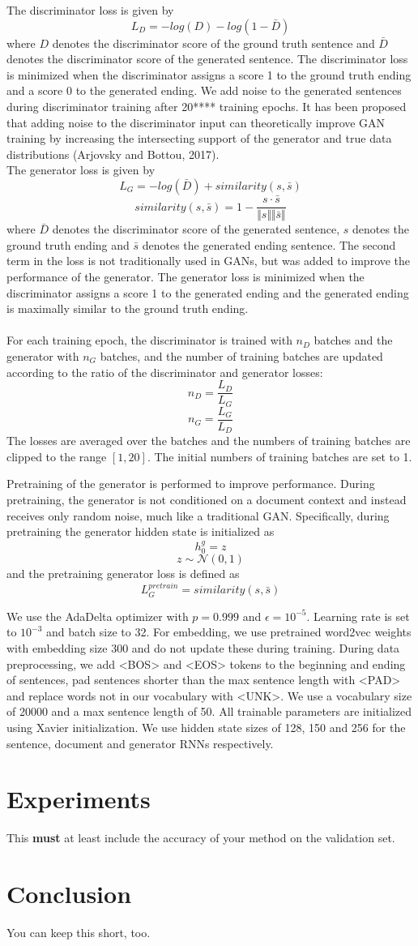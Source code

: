 \documentclass{article}
\begin{document}
The discriminator loss is given by
$$ L_{D} = -log(D) - log(1-\bar{D})$$
where $D$ denotes the discriminator score of the ground truth sentence and $\bar{D}$ denotes the discriminator score of the generated sentence. The discriminator loss is minimized when the discriminator assigns a score 1 to the ground truth ending and a score 0 to the generated ending.
We add noise to the generated sentences during discriminator training after 20**** training epochs. It has been proposed that adding noise to the discriminator input can theoretically improve GAN training by increasing the intersecting support of the generator and true data distributions (Arjovsky and Bottou, 2017). \\

The generator loss is given by
$$ L_{G} = -log(\bar{D}) + similarity(s, \bar{s}) $$
$$ similarity(s, \bar{s}) = 1 - \frac{s \cdot \bar{s}}{\Vert s \Vert \Vert \bar{s} \Vert} $$
where $\bar{D}$ denotes the discriminator score of the generated sentence, $s$ denotes the ground truth ending and $\bar{s}$ denotes the generated ending sentence. The second term in the loss is not traditionally used in GANs, but was added to improve the performance of the generator. The generator loss is minimized when the discriminator assigns a score 1 to the generated ending and the generated ending is maximally similar to the ground truth ending. \\ \\
For each training epoch, the discriminator is trained with $n_{D}$ batches and the generator with $n_{G}$ batches, and the number of training batches are updated according to the ratio of the discriminator and generator losses:
$$ n_{D} = \frac{L_{D}}{L_{G}} $$ 
$$ n_{G} = \frac{L_{G}}{L_{D}} $$
The losses are averaged over the batches and the numbers of training batches are clipped to the range $[1,20]$. The initial numbers of training batches are set to 1.

Pretraining of the generator is performed to improve performance. During pretraining, the generator is not conditioned on a document context and instead receives only random noise, much like a traditional GAN. Specifically, during pretraining the generator hidden state is initialized as
$$ h^{g}_{0} = z $$
$$ z \sim \mathcal{N}(0,1) $$
and the pretraining generator loss is defined as
$$ L_{G}^{pretrain} = similarity(s, \bar{s}) $$

We use the AdaDelta optimizer with $p=0.999$ and $\epsilon=10^{-5}$. Learning rate is set to $10^{-3}$ and batch size to 32. For embedding, we use pretrained word2vec weights with embedding size 300 and do not update these during training. During data preprocessing, we add <BOS> and <EOS> tokens to the beginning and ending of sentences, pad sentences shorter than the max sentence length with <PAD> and replace words not in our vocabulary with <UNK>. We use a vocabulary size of 20000 and a max sentence length of 50. All trainable parameters are initialized using Xavier initialization. We use hidden state sizes of 128, 150 and 256 for the sentence, document and generator RNNs respectively.

\section{Experiments}
This {\bf must} at least include the accuracy of your method on the validation set.
\section{Conclusion}
You can keep this short, too.
\end{document}
